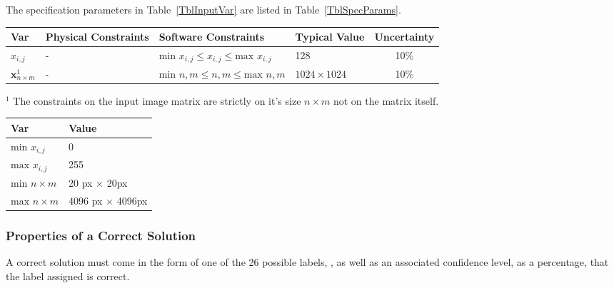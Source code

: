 \documentclass[12pt]{article}
\begin{document}
The specification parameters in Table~\ref{TblInputVar} are listed in
Table~\ref{TblSpecParams}.

\begin{table}[!h]
  \caption{Input Variables} \label{TblInputVar}
  \renewcommand{\arraystretch}{1.2}
\noindent \begin{longtable*}{l l l l c} 
  \toprule
  \textbf{Var} & \textbf{Physical Constraints} & \textbf{Software Constraints} &
                             \textbf{Typical Value} & \textbf{Uncertainty}\\
  \midrule 
  $x_{i,j}$& - & ${\text{min }} x_{i,j} \leq x_{i,j} \leq {\text{max }} x_{i,j}$ & 128 & 10\%
  \\
  $\mathbf{x}_{n \times m}^1$& - & ${\text{min }} n, m \leq n, m \leq {\text{max }} n, m$ & $1024 \times 1024$ & 10\%
  \\
  \bottomrule
\end{longtable*}
\end{table}

\noindent 
\begin{description}
\item $^1$ The constraints on the input image matrix are strictly on it's size $n \times m$ not on the matrix itself.
\end{description}

\begin{table}[!h]
\caption{Specification Parameter Values} \label{TblSpecParams}
\renewcommand{\arraystretch}{1.2}
\noindent \begin{longtable*}{l l} 
  \toprule
  \textbf{Var} & \textbf{Value} \\
  \midrule 
  $\text{min } x_{i,j}$ & 0\\
  $\text{max } x_{i,j}$ & 255\\
  $\text{min } n \times m$ & 20 px $\times$ 20px\\
  $\text{max } n \times m$ & 4096 px $\times$ 4096px\\
  \bottomrule
\end{longtable*}
\end{table}

\subsubsection{Properties of a Correct Solution} \label{sec_CorrectSolution}

\noindent
A correct solution must come in the form of one of the 26 possible labels,
, as well as an associated 
confidence level, as a percentage, that the label assigned is correct.
\end{document}
